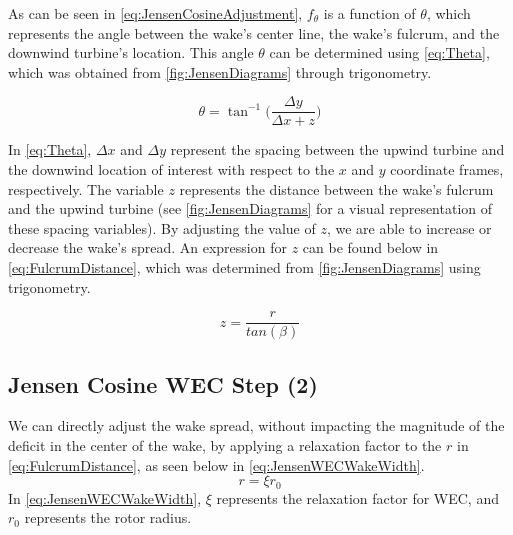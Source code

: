 \documentclass[a4paper]{jpconf}
\begin{document}

As can be seen in \cref{eq:JensenCosineAdjustment}, $f_\theta$ is a function of $\theta$, which represents the angle between the wake's center line, the wake's fulcrum, and the downwind turbine's location. This angle $\theta$ can be determined using \cref{eq:Theta}, which was obtained from \cref{fig:JensenDiagrams} through trigonometry.

\begin{equation}
\theta = \tan^{-1}\Big( \frac{\Delta y}{\Delta x + z} \Big)
\label{eq:Theta}
\end{equation}

In \cref{eq:Theta}, $\Delta x$ and $\Delta y$ represent the spacing between the upwind turbine and the downwind location of interest with respect to the $x$ and $y$ coordinate frames, respectively. The variable $z$ represents the distance between the wake's fulcrum and the upwind turbine (see \cref{fig:JensenDiagrams} for a visual representation of these spacing variables). By adjusting the value of $z$, we are able to increase or decrease the wake's spread. An expression for $z$ can be found below in \cref{eq:FulcrumDistance}, which was determined from \cref{fig:JensenDiagrams} using trigonometry.

\begin{equation}
z = \frac{r}{tan(\beta)}
\label{eq:FulcrumDistance}
\end{equation} 

\subsection{Jensen Cosine WEC Step (2)}
We can directly adjust the wake spread, without impacting the magnitude of the deficit in the center of the wake, by applying a relaxation factor to the $r$ in \cref{eq:FulcrumDistance}, as seen below in \cref{eq:JensenWECWakeWidth}.
%
\begin{equation}
    r = \xi r_0
    \label{eq:JensenWECWakeWidth}
\end{equation}
%
In \cref{eq:JensenWECWakeWidth}, $\xi$ represents the relaxation factor for WEC, and $r_0$ represents the rotor radius.
\end{document}
